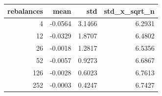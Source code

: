 \begin{tabular}{rrrr}
\toprule
rebalances & mean & std & std_x_sqrt_n \\
\midrule
4 & -0.0564 & 3.1466 & 6.2931 \\
12 & -0.0329 & 1.8707 & 6.4802 \\
26 & -0.0018 & 1.2817 & 6.5356 \\
52 & -0.0057 & 0.9273 & 6.6867 \\
126 & -0.0028 & 0.6023 & 6.7613 \\
252 & -0.0003 & 0.4247 & 6.7427 \\
\bottomrule
\end{tabular}
